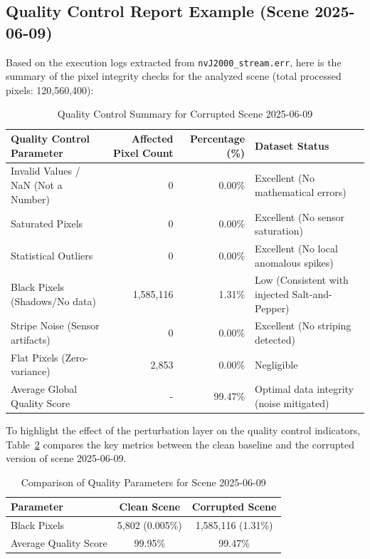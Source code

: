 \documentclass[10pt,conference,compsoc]{IEEEtran}
\begin{document}
\subsection{Quality Control Report Example (Scene 2025-06-09)}
Based on the execution logs extracted from \texttt{nvJ2000\_stream.err}, here is the summary of the pixel integrity checks for the analyzed scene (total processed pixels: 120,560,400):
\begin{table}[t]%
\centering
\caption{Quality Control Summary for Corrupted Scene 2025-06-09}
\label{tab:quality_control_corrupted}
\begin{tabular}{l r r l}
\hline
\textbf{Quality Control Parameter} & \textbf{Affected Pixel Count} & \textbf{Percentage (\%)} & \textbf{Dataset Status} \\
\hline
Invalid Values / NaN (Not a Number) & 0 & 0.00\% & Excellent (No mathematical errors) \\
Saturated Pixels & 0 & 0.00\% & Excellent (No sensor saturation) \\
Statistical Outliers & 0 & 0.00\% & Excellent (No local anomalous spikes) \\
Black Pixels (Shadows/No data) & 1,585,116 & 1.31\% & Low (Consistent with injected Salt-and-Pepper) \\
Stripe Noise (Sensor artifacts) & 0 & 0.00\% & Excellent (No striping detected) \\
Flat Pixels (Zero-variance) & 2,853 & 0.00\% & Negligible \\
\hline
Average Global Quality Score & - & 99.47\% & Optimal data integrity (noise mitigated) \\
\hline
\end{tabular}
\end{table}

To highlight the effect of the perturbation layer on the quality control indicators, Table~\ref{tab:quality_comparison} compares the key metrics between the clean baseline and the corrupted version of scene 2025-06-09.
\begin{table}[h]
\centering
\caption{Comparison of Quality Parameters for Scene 2025-06-09}
\label{tab:quality_comparison}
\begin{tabular}{lcc}
\hline
\textbf{Parameter} & \textbf{Clean Scene} & \textbf{Corrupted Scene} \\ \hline
Black Pixels & 5,802 (0.005\%) & 1,585,116 (1.31\%) \\
Average Quality Score & 99.95\% & 99.47\% \\ \hline
\end{tabular}
\end{table}
\end{document}
